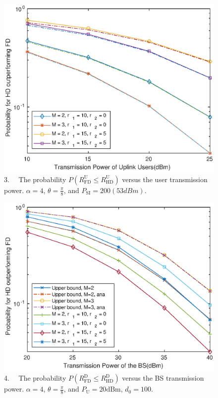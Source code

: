 \documentclass[aspectratio=169]{beamer}
\begin{document}
\begin{frame}
	\begin{figure}
		\centering
		\includegraphics[width=0.6\linewidth]{images/3.eps}
		\caption{3.$\quad$ The probability $P(R_{\text{FD}}^{\text{U}}\leqslant R_{\text{HD}}^{\text{U}})$ versus the user transmission power. $\alpha = 4$, $\theta = \frac{\pi}{8}$, and $P_{\text{SI}} = 200(53dBm)$.}
		\label{fig:fig3}
	\end{figure}
\end{frame}

\begin{frame}
		\begin{figure}
			\centering
			\includegraphics[width=0.6\linewidth]{images/4.eps}
			\caption{4.$\quad$ The probability $P(R_{\text{FD}}^{\text{D}}\leqslant R_{\text{HD}}^{\text{D}})$ versus the BS transmission power. $\alpha = 4$, $\theta = \frac{\pi}{8}$, and $P_{\text{U}} = 20\text{dBm}$, $d_0 = 100$.}
			\label{fig:fig4}
		\end{figure}
\end{frame}
	
\end{document}

